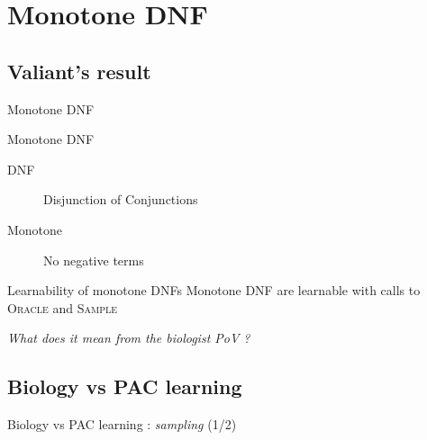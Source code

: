 \documentclass{beamer}
\newcommand{\transition}{\vspace{1em}\flushright \itshape}
\begin{document}
\section{Monotone DNF}
\subsection{Valiant's result}
\begin{frame}{Monotone DNF}
	\begin{block}{Monotone DNF}
		\begin{description}
			\item[DNF] Disjunction of Conjunctions
			\item[Monotone] No negative terms
		\end{description}
	\end{block}
\begin{block}{Learnability of monotone DNFs}
	Monotone DNF are learnable with calls to \textsc{Oracle} and \textsc{Sample}
\end{block}
\transition What does it mean from the biologist PoV ?
\end{frame}
\subsection{Biology vs PAC learning}
\begin{frame}{Biology vs PAC learning : \textit{sampling} (1/2)}

\end{frame}
\end{document}
